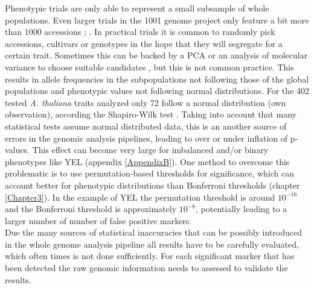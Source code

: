 Phenotypic trials are only able to represent a small subsample of whole populations. Even
larger trials in the 1001 genome project only feature a bit more than 1000 accessions
\cite{atwell2010}; \cite{1001genome}. In practical trials it is common to randomly pick
accessions, cultivars or genotypes in the hope that they will segregate for a certain
trait. Sometimes this can be backed by a PCA or an analysis of molecular variance to
choose suitable candidates \cite{holker2019european}, but this is not common practice. This
results in allele frequencies in the subpopulations not following those of the global
populations and phenotypic values not following normal distributions. For the 402 tested
\textit{A. thaliana} traits analyzed only 72 follow a normal distribution (own
observation), according the Shapiro-Wilk test \cite{shapiro1965analysis}. Taking into
account that many statistical tests assume normal distributed data, this is an another
source of errors in the genomic analysis pipelines, leading to over or under inflation of
p-values. This effect can become very large for imbalanced and/or binary phenotypes like
YEL (appendix \ref{AppendixB}). One method to overcome this problematic is to use
permutation-based thresholds for significance, which can account better for phenotypic
distributions than Bonferroni thresholds (chapter \ref{Chapter3}). In the example of YEL
the permutation threshold is around $10^{-16}$ and the Bonferroni threshold is
approximately $10^{-8 }$, potentially leading to a larger number of number of false
positive markers.\\
Due the many sources of statistical inaccuracies that can be possibly introduced in the
whole genome analysis pipeline all results have to be carefully evaluated, which often
times is not done sufficiently. For each significant marker that has been detected the raw
genomic information needs to assessed to validate the results.


